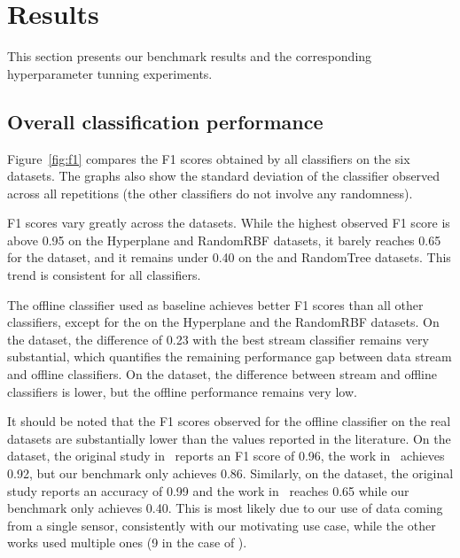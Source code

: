 \section{Results}
This section presents our benchmark results and the corresponding
hyperparameter tunning experiments.


\subsection{Overall classification performance}

Figure~\ref{fig:f1} compares the F1 scores obtained by all classifiers on
the six datasets. The graphs also show the standard deviation of the
\mondrianforest classifier observed across all repetitions (the other
classifiers do not involve any randomness). 

F1 scores vary greatly across the datasets. While the highest
observed F1 score is above 0.95 on the Hyperplane and RandomRBF datasets,
it barely reaches 0.65 for the \banosdataset dataset, and it remains under
0.40 on the \recofitdataset and RandomTree datasets. This trend is
consistent for all classifiers.

The offline \knn classifier used as baseline achieves better F1 scores than
all other classifiers, except for the \mondrianforest on the Hyperplane and
the RandomRBF datasets. On the \banosdataset dataset, the difference of
0.23 with the best stream classifier remains very substantial, which
quantifies the remaining performance gap between data stream and offline
classifiers. On the \recofitdataset dataset, the difference between stream
and offline classifiers is lower, but the offline performance remains very
low.

It should be noted that the F1 scores observed for the offline \knn
classifier on the real datasets are substantially lower than the values
reported in the literature. On the \banosdataset dataset, the original
study in~\cite{Banos_2014} reports an F1 score of 0.96, the work
in~\cite{behzad2019} achieves 0.92, but our benchmark only achieves 0.86.
Similarly, on the \recofitdataset dataset, the original study reports an
accuracy of 0.99 and the
work in~\cite{behzad2019} reaches 0.65 while our benchmark only achieves
0.40. This is most likely due to our use of data coming from a single
sensor, consistently with our motivating use case, while the other works used
multiple ones (9 in the case of
\banosdataset).

